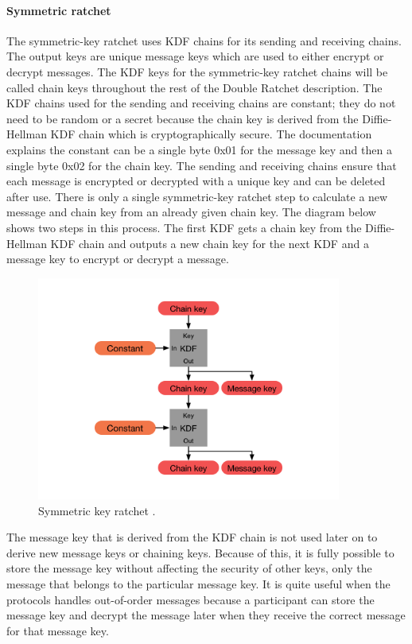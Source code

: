 \paragraph{Symmetric ratchet}
The symmetric-key ratchet uses KDF chains for its sending and receiving
chains. The output keys are unique message keys which are used to either
encrypt or decrypt messages. The KDF keys for the symmetric-key ratchet
chains will be called chain keys throughout the rest of the Double Ratchet
description.
The KDF chains used for the sending and receiving chains are constant;
they do not need to be random or a secret because the chain key is derived
from the Diffie-Hellman KDF chain which is cryptographically secure. The
documentation explains the constant can be a single byte 0x01 for the
message key and then a single byte 0x02 for the chain key. The sending
and receiving chains ensure that each message is encrypted or decrypted
with a unique key and can be deleted after use. There is only a single
symmetric-key ratchet step to calculate a new message and chain key from
an already given chain key. The diagram below shows two steps in this
process. The first KDF gets a chain key from the Diffie-Hellman KDF chain
and outputs a new chain key for the next KDF and a message key to encrypt
or decrypt a message.

\begin{figure}[H]
	\centering
	\includegraphics[width=10cm]{figures/symmetrickeyratchet.png}
	\caption{Symmetric key ratchet \cite{doubleratchet}.}
	\label{fig:symkeyratchet}
\end{figure}

The message key that is derived from the KDF chain is not used later on to derive new message keys or chaining keys. Because of this, it is fully
possible to store the message key without affecting the security of other
keys, only the message that belongs to the particular message key. It is
quite useful when the protocols handles out-of-order messages because a
participant can store the message key and decrypt the message later when
they receive the correct message for that message key.

